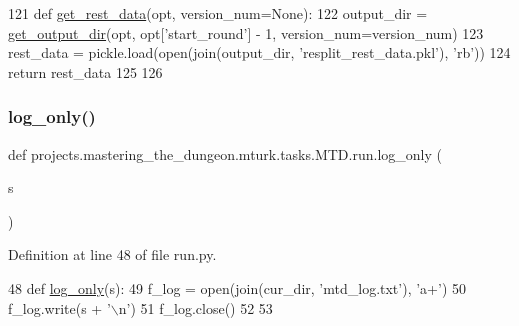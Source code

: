 \begin{DoxyCode}
121 \textcolor{keyword}{def }\hyperlink{namespaceprojects_1_1mastering__the__dungeon_1_1mturk_1_1tasks_1_1MTD_1_1run_ae9acbe1fe240a624b01fed3f073cc780}{get\_rest\_data}(opt, version\_num=None):
122     output\_dir = \hyperlink{namespaceprojects_1_1mastering__the__dungeon_1_1mturk_1_1tasks_1_1MTD_1_1run_a7f8196f264013bc16be3e85fe5c68f0d}{get\_output\_dir}(opt, opt[\textcolor{stringliteral}{'start\_round'}] - 1, version\_num=version\_num)
123     rest\_data = pickle.load(open(join(output\_dir, \textcolor{stringliteral}{'resplit\_rest\_data.pkl'}), \textcolor{stringliteral}{'rb'}))
124     \textcolor{keywordflow}{return} rest\_data
125 
126 
\end{DoxyCode}
\mbox{\label{namespaceprojects_1_1mastering__the__dungeon_1_1mturk_1_1tasks_1_1MTD_1_1run_ab07d5984a91787cd069fa0a7deba945f}} 
\subsubsection{\texorpdfstring{log\+\_\+only()}{log\_only()}}
{\footnotesize\ttfamily def projects.\+mastering\+\_\+the\+\_\+dungeon.\+mturk.\+tasks.\+M\+T\+D.\+run.\+log\+\_\+only (\begin{DoxyParamCaption}\item[{}]{s }\end{DoxyParamCaption})}



Definition at line 48 of file run.\+py.


\begin{DoxyCode}
48 \textcolor{keyword}{def }\hyperlink{namespaceprojects_1_1mastering__the__dungeon_1_1mturk_1_1tasks_1_1MTD_1_1run_ab07d5984a91787cd069fa0a7deba945f}{log\_only}(s):
49     f\_log = open(join(cur\_dir, \textcolor{stringliteral}{'mtd\_log.txt'}), \textcolor{stringliteral}{'a+'})
50     f\_log.write(s + \textcolor{stringliteral}{'\(\backslash\)n'})
51     f\_log.close()
52 
53 
\end{DoxyCode}
\mbox{\label{namespaceprojects_1_1mastering__the__dungeon_1_1mturk_1_1tasks_1_1MTD_1_1run_a09ef624249e781a7cb8a9b65993aa370}} 
